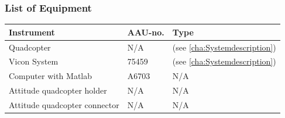 \subsubsection{List of Equipment}
\begin{table}[H]
    \centering
	\begin{tabular}{|l|l|p{4.3cm}|}
		\hline%
		\textbf{Instrument}   &  \textbf{AAU-no.}  &  \textbf{Type}                       \\
		\hline%
		Quadcopter    	&  N/A 						&  (see \autoref{cha:Systemdescription}) 		      	 \\
		\hline%
	    Vicon System 			& 75459                 &  (see \autoref{cha:Systemdescription})                  \\
		\hline%
		Computer with Matlab       &  A6703		 & N/A     \\
		\hline%
		Attitude quadcopter holder      &  N/A		 & N/A     \\
		\hline%
		Attitude quadcopter connector    &  N/A		 & N/A     \\
		\hline%
	\end{tabular}
\end{table}




